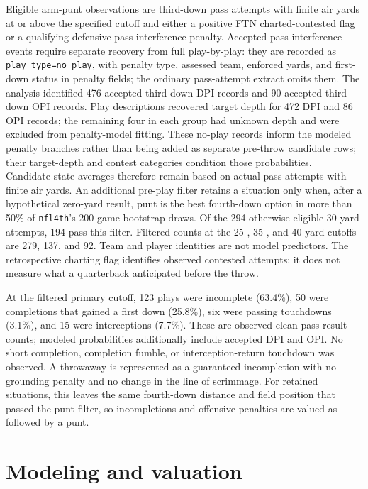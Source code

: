 \documentclass[11pt]{article}
\begin{document}
Eligible arm-punt observations are third-down pass attempts with finite air yards at or above the specified cutoff and either a positive FTN charted-contested flag or a qualifying defensive pass-interference penalty. Accepted pass-interference events require separate recovery from full play-by-play: they are recorded as \texttt{play\_type=no\_play}, with penalty type, assessed team, enforced yards, and first-down status in penalty fields; the ordinary pass-attempt extract omits them. The analysis identified 476 accepted third-down DPI records and 90 accepted third-down OPI records. Play descriptions recovered target depth for 472 DPI and 86 OPI records; the remaining four in each group had unknown depth and were excluded from penalty-model fitting. These no-play records inform the modeled penalty branches rather than being added as separate pre-throw candidate rows; their target-depth and contest categories condition those probabilities. Candidate-state averages therefore remain based on actual pass attempts with finite air yards. An additional pre-play filter retains a situation only when, after a hypothetical zero-yard result, punt is the best fourth-down option in more than 50\% of \texttt{nfl4th}'s 200 game-bootstrap draws. Of the 294 otherwise-eligible 30-yard attempts, 194 pass this filter. Filtered counts at the 25-, 35-, and 40-yard cutoffs are 279, 137, and 92. Team and player identities are not model predictors. The retrospective charting flag identifies observed contested attempts; it does not measure what a quarterback anticipated before the throw.

At the filtered primary cutoff, 123 plays were incomplete (63.4\%), 50 were completions that gained a first down (25.8\%), six were passing touchdowns (3.1\%), and 15 were interceptions (7.7\%). These are observed clean pass-result counts; modeled probabilities additionally include accepted DPI and OPI. No short completion, completion fumble, or interception-return touchdown was observed. A throwaway is represented as a guaranteed incompletion with no grounding penalty and no change in the line of scrimmage. For retained situations, this leaves the same fourth-down distance and field position that passed the punt filter, so incompletions and offensive penalties are valued as followed by a punt.

\section{Modeling and valuation}
\end{document}
